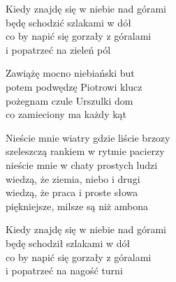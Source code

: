 \begin{text}
    Kiedy znajdę się w niebie nad górami\\
    będę schodzić szlakami w dół\\
    co by napić się gorzały z góralami\\
    i popatrzeć na zieleń pól

    Zawiążę mocno niebiański but\\
    potem podwędzę Piotrowi klucz\\
    pożegnam czule Urszulki dom\\
    co zamieciony ma każdy kąt

    Nieście mnie wiatry gdzie liście brzozy\\
    szeleszczą rankiem w rytmie pacierzy\\
    nieście mnie w chaty prostych ludzi\\
    wiedzą, że ziemia, niebo i drugi\\
    wiedzą, że praca i proste słowa\\
    piękniejsze, milsze są niż ambona

    Kiedy znajdę się w niebie nad górami\\
    będę schodził szlakami w dół\\
    co by napić się gorzały z góralami\\
    i popatrzeć na nagość turni
\end{text}
\begin{chord}

\end{chord}